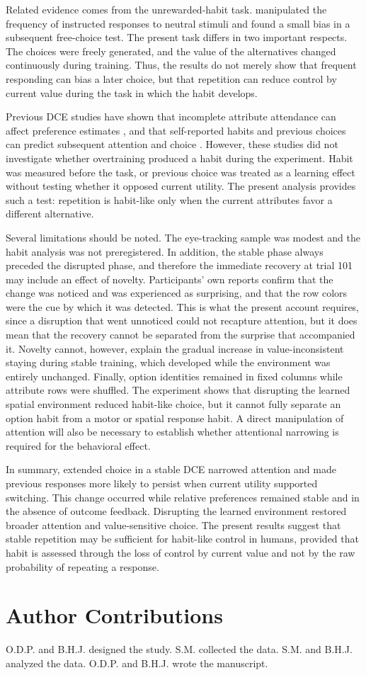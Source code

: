\documentclass[man,natbib,floatsintext]{apa7}
\begin{document}
Related evidence comes from the unrewarded-habit task. \citet{nebe2024} manipulated the frequency of instructed responses to neutral stimuli and found a small bias in a subsequent free-choice test. The present task differs in two important respects. The choices were freely generated, and the value of the alternatives changed continuously during training. Thus, the results do not merely show that frequent responding can bias a later choice, but that repetition can reduce control by current value during the task in which the habit develops.

Previous DCE studies have shown that incomplete attribute attendance can affect preference estimates \citep{yegoryan2020}, and that self-reported habits and previous choices can predict subsequent attention and choice \citep{blake2020}. However, these studies did not investigate whether overtraining produced a habit during the experiment. Habit was measured before the task, or previous choice was treated as a learning effect without testing whether it opposed current utility. The present analysis provides such a test: repetition is habit-like only when the current attributes favor a different alternative.

Several limitations should be noted. The eye-tracking sample was modest and the habit analysis was not preregistered. In addition, the stable phase always preceded the disrupted phase, and therefore the immediate recovery at trial 101 may include an effect of novelty. Participants' own reports confirm that the change was noticed and was experienced as surprising, and that the row colors were the cue by which it was detected. This is what the present account requires, since a disruption that went unnoticed could not recapture attention, but it does mean that the recovery cannot be separated from the surprise that accompanied it. Novelty cannot, however, explain the gradual increase in value-inconsistent staying during stable training, which developed while the environment was entirely unchanged. Finally, option identities remained in fixed columns while attribute rows were shuffled. The experiment shows that disrupting the learned spatial environment reduced habit-like choice, but it cannot fully separate an option habit from a motor or spatial response habit. A direct manipulation of attention will also be necessary to establish whether attentional narrowing is required for the behavioral effect.

In summary, extended choice in a stable DCE narrowed attention and made previous responses more likely to persist when current utility supported switching. This change occurred while relative preferences remained stable and in the absence of outcome feedback. Disrupting the learned environment restored broader attention and value-sensitive choice. The present results suggest that stable repetition may be sufficient for habit-like control in humans, provided that habit is assessed through the loss of control by current value and not by the raw probability of repeating a response.

\section{Author Contributions}

O.D.P. and B.H.J. designed the study. S.M. collected the data. S.M. and B.H.J. analyzed the data. O.D.P. and B.H.J. wrote the manuscript.


\end{document}
